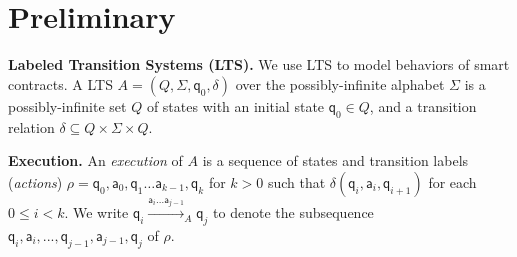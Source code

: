 
\section{Preliminary}
\label{sec:preli}

\textbf{Labeled Transition Systems (LTS).} 
We use LTS to model behaviors of smart contracts. 
A LTS $A=(Q,\Sigma,  \mathsf{q}_0, \delta)$ over the possibly-infinite alphabet
$\Sigma$ is a possibly-infinite set $Q$ of states with
an initial state $\mathsf{q}_0 \in Q$, and a transition relation $\delta \subseteq Q \times \Sigma \times
Q$. 

\noindent
\textbf{Execution.} 
An \emph{execution} of $A$ is a sequence of states and transition labels (\emph{actions}) $\rho = \mathsf{q}_0, \mathsf{a}_0,\mathsf{q}_1\ldots \mathsf{a}_{k-1},\mathsf{q}_k$ for $k>0$ such that $\delta(\mathsf{q}_i, \mathsf{a}_i, \mathsf{q}_{i+1})$ for each $0\leq i<k$. We write $\mathsf{q}_i\xrightarrow{\mathsf{a}_i\ldots \mathsf{a}_{j-1}}_A \mathsf{q}_j$ to denote the subsequence $\mathsf{q}_i,\mathsf{a}_i,...,\mathsf{q}_{j-1},\mathsf{a}_{j-1},\mathsf{q}_j$ of $\rho$.









